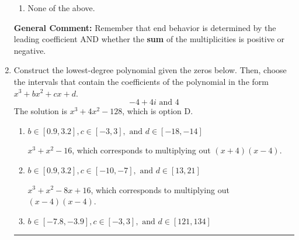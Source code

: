 \documentclass{extbook}[14pt]
\newcommand{\litem}[1]{\item #1

\rule{\textwidth}{0.4pt}}
\begin{document}
\begin{enumerate}
{\begin{enumerate}[label=\Alph*.]
\item None of the above.\end{enumerate}
\textbf{General Comment:} Remember that end behavior is determined by the leading coefficient AND whether the \textbf{sum} of the multiplicities is positive or negative.
}
\litem{
Construct the lowest-degree polynomial given the zeros below. Then, choose the intervals that contain the coefficients of the polynomial in the form $x^3+bx^2+cx+d$.
\[ -4 + 4 i \text{ and } 4 \]The solution is \( x^{3} +4 x^{2} -128 \), which is option D.\begin{enumerate}[label=\Alph*.]
\item \( b \in [0.9, 3.2], c \in [-3, 3], \text{ and } d \in [-18, -14] \)

$x^{3} + x^{2} -16$, which corresponds to multiplying out $(x + 4)(x -4)$.
\item \( b \in [0.9, 3.2], c \in [-10, -7], \text{ and } d \in [13, 21] \)

$x^{3} + x^{2} -8 x + 16$, which corresponds to multiplying out $(x -4)(x -4)$.
\item \( b \in [-7.8, -3.9], c \in [-3, 3], \text{ and } d \in [121, 134] \)


\end{enumerate}}
\end{enumerate}
\end{document}

